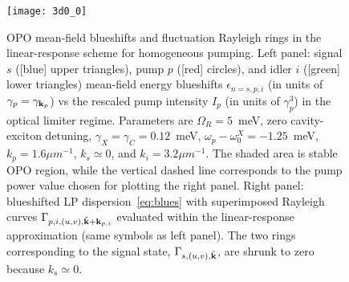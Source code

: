 \begin{figure}[tb]
\centering
\texttt{[image: 3d0\_0]} %
\caption{OPO mean-field blueshifts and fluctuation
  Rayleigh rings in the linear-response scheme for homogeneous
  pumping. Left panel: signal $s$ ([blue] upper triangles), pump $p$
  ([red] circles), and idler $i$ ([green] lower triangles) mean-field
  energy blueshifts $\epsilon_{n=s,p,i}$ (in units of $\gamma_p =
  \gamma_{\mathbf{k}_p}$) vs the rescaled pump intensity $I_p$ (in
  units of $\gamma_p^3$) in the optical limiter regime. Parameters are
  $\Omega_R=5$~meV, zero cavity-exciton detuning, $\gamma_X = \gamma_C
  = 0.12$~meV, $\omega_p - \omega_0^X = -1.25$~meV, $k_p=1.6{\mu
    m}^{-1}$, $k_s \simeq 0$, and $k_i=3.2{\mu m}^{-1}$.  The shaded
  area is stable OPO region, while the vertical dashed line
  corresponds to the pump power value chosen for plotting the right
  panel. Right panel: blueshifted LP dispersion~\eqref{eq:blues} with
  superimposed Rayleigh curves $\Gamma_{p,i,(u,v), \tilde{\mathbf{k}} +
    \mathbf{k}_{p, i}}$ evaluated within the linear-response
  approximation (same symbols as left panel). The two rings
  corresponding to the signal state, $\Gamma_{s,(u,v),
    \tilde{\mathbf{k}}}$, are shrunk to zero because $k_s \simeq 0$.}
\label{fig:spect}
\end{figure}
%


